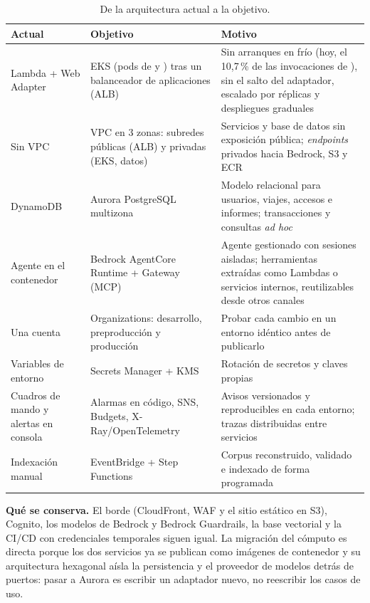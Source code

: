 \begin{table}[t]
\centering\scriptsize
\caption{De la arquitectura actual a la objetivo.}\label{tab:objetivo}
\begin{tabularx}{\columnwidth}{@{}L{1.55cm}L{1.95cm}Y@{}}
\toprule
\textbf{Actual} & \textbf{Objetivo} & \textbf{Motivo} \\
\midrule
Lambda + Web Adapter & EKS (pods de  y ) tras un balanceador de aplicaciones (ALB) & Sin arranques en frío (hoy, el 10,7\,\% de las invocaciones de ), sin el salto del adaptador, escalado por réplicas y despliegues graduales \\
Sin VPC & VPC en 3 zonas: subredes públicas (ALB) y privadas (EKS, datos) & Servicios y base de datos sin exposición pública; \emph{endpoints} privados hacia Bedrock, S3 y ECR \\
DynamoDB & Aurora PostgreSQL multizona & Modelo relacional para usuarios, viajes, accesos e informes; transacciones y consultas \emph{ad hoc} \\
Agente en el contenedor & Bedrock AgentCore Runtime + Gateway (MCP) & Agente gestionado con sesiones aisladas; herramientas extraídas como Lambdas o servicios internos, reutilizables desde otros canales \\
Una cuenta & Organizations: desarrollo, preproducción y producción & Probar cada cambio en un entorno idéntico antes de publicarlo \\
Variables de entorno & Secrets Manager + KMS & Rotación de secretos y claves propias \\
Cuadros de mando y alertas en consola & Alarmas en código, SNS, Budgets, X-Ray/OpenTelemetry & Avisos versionados y reproducibles en cada entorno; trazas distribuidas entre servicios \\
Indexación manual & EventBridge + Step Functions & Corpus reconstruido, validado e indexado de forma programada \\
\bottomrule
\end{tabularx}
\end{table}

\textbf{Qué se conserva.} El borde (CloudFront, WAF y el sitio estático en S3), Cognito, los
modelos de Bedrock y Bedrock Guardrails, la base vectorial y la CI/CD con credenciales temporales
siguen igual. La migración del cómputo es directa porque los dos servicios ya se publican como
imágenes de contenedor y su arquitectura hexagonal aísla la persistencia y el proveedor de modelos
detrás de puertos: pasar a Aurora es escribir un adaptador nuevo, no reescribir los casos de uso.

